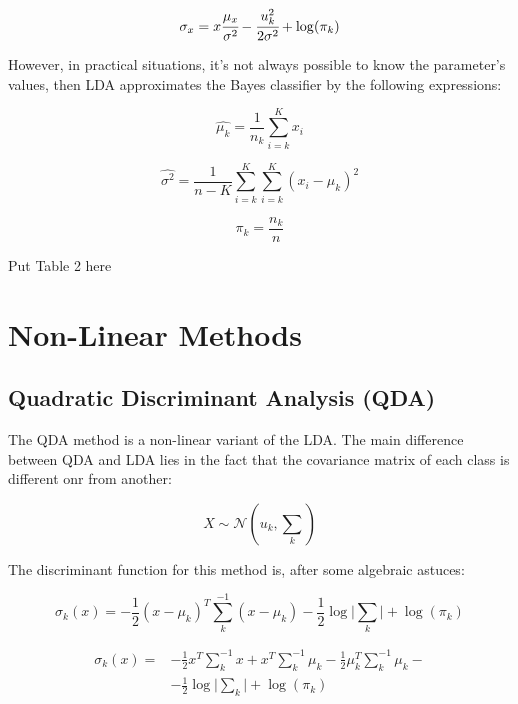 \documentclass[conference]{IEEEtran}
\newcommand{\reviewUrgent}[1]{{\color{red} #1}} %
\begin{document}
\begin{equation}
    \sigma_x = x\cfrac{\mu_x}{\sigma^2} - \cfrac{u_k^2}{2\sigma^2} + \log(\pi_k) \label{eq9}
\end{equation}

However, in practical situations, it's not always possible to know the parameter's values,
then LDA approximates the Bayes classifier by the following expressions:

\begin{equation}
    \hat{\mu_k} = \frac{1}{n_k} \sum^K_{i = k} x_i \label{eq10}
\end{equation}

\begin{equation}
    \hat{\sigma^2} = \frac{1}{n-K} \sum^K_{i = k} \sum^K_{i = k} (x_i-\hat{\mu_k})^2 \label{eq11}
\end{equation}

\begin{equation}
    \pi_k = \frac{n_k}{n}\label{eq12}
\end{equation}


\reviewUrgent{Put Table 2 here}


\section{Non-Linear Methods}

\subsection{Quadratic Discriminant Analysis (QDA)}

The QDA method is a non-linear variant of the LDA. The main difference between QDA and LDA
lies in the fact that the covariance matrix of each class is different onr from another:

\begin{equation}
    X \sim  \mathcal{N}(u_k, \textstyle \sum_k)\label{eq13}
\end{equation}

The discriminant function for this method is, after some algebraic astuces:

\begin{equation}
    \sigma_k(x) = -\frac{1}{2}(x-\mu_k)^T\sum^{-1}_k(x-\mu_k) - \frac{1}{2}\log \lvert\sum_k\rvert +\log(\pi_k) \label{eq14}
\end{equation}

\begin{equation}
\begin{aligned}
    \sigma_k(x) = {} 
    & -\frac{1}{2}x^T\sum^{-1}_kx + x^T\sum^{-1}_k\mu_k -  \frac{1}{2}\mu_k^T\sum^{-1}_k\mu_k - \\ 
    & - \frac{1}{2}\log \lvert\sum_k\rvert +\log(\pi_k) \label{eq15}
\end{aligned}
\end{equation}
\end{document}
